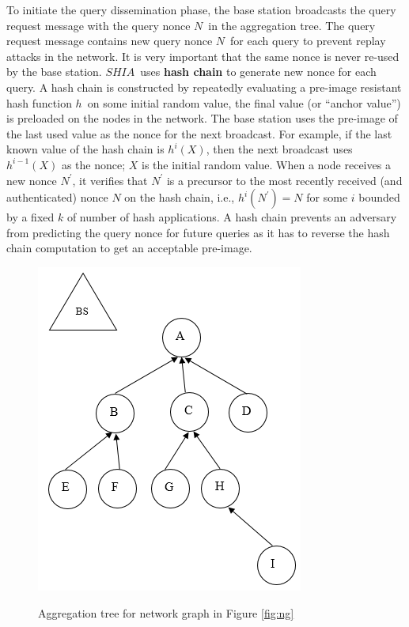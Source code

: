 		To initiate the query dissemination phase, the base station broadcasts the query request message with the query nonce $N$\ in the aggregation tree. 
		The query request message contains new query nonce $N$\ for each query to prevent replay attacks in the network.
		It is very important that the same nonce is never re-used by the base station.
		$SHIA$\ uses \textbf{hash chain} to generate new nonce for each query. 
		A hash chain is constructed by repeatedly evaluating a pre-image resistant hash function $h$\ on some initial random value, the final value (or ``anchor value'') is preloaded on the nodes in the network.
		The base station uses the pre-image of the last used  value as the nonce for the next broadcast.
		For example, if the last known value of the hash chain is $h^i(X)$, then the next broadcast uses $h^{i-1}(X)$ as the nonce; $X$ is the initial random value.
		When a node receives a new nonce $N^{'}$, it verifies that $N^{'}$ is a precursor to the most recently received (and authenticated) nonce $N$ on the hash chain, i.e., $h^{i}(N^{'}) = N$ for some $i$ bounded by a fixed $k$ of number of hash applications.  
		A hash chain prevents an adversary from predicting the query nonce for future queries as it has to reverse the hash chain computation to get an acceptable pre-image.
		\begin{figure}[h!]
			\centering
			\includegraphics[scale = 1]{images/aggregation-tree.png}\\
			\caption{Aggregation tree for network graph in Figure \ref{fig:ng}}
			\label{fig:at}
		\end{figure}		
